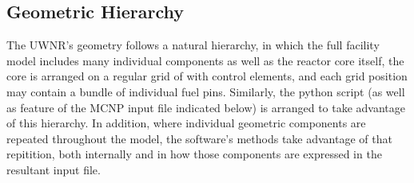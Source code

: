 \documentclass{UWNR_modeling}
\begin{document}
\subsection{Geometric Hierarchy}\label{ssection:geom_hier}

The UWNR's geometry follows a natural hierarchy, in which the full facility model includes many individual components as well as the reactor core itself, the core is arranged on a regular grid of with control elements, and each grid position may contain a bundle of individual fuel pins.  Similarly, the python script (as well as feature of the MCNP input file indicated below) is arranged to take advantage of this hierarchy.  In addition, where individual geometric components are repeated throughout the model, the software's methods take advantage of that repitition, both internally and in how those components are expressed in the resultant input file.
\end{document}
